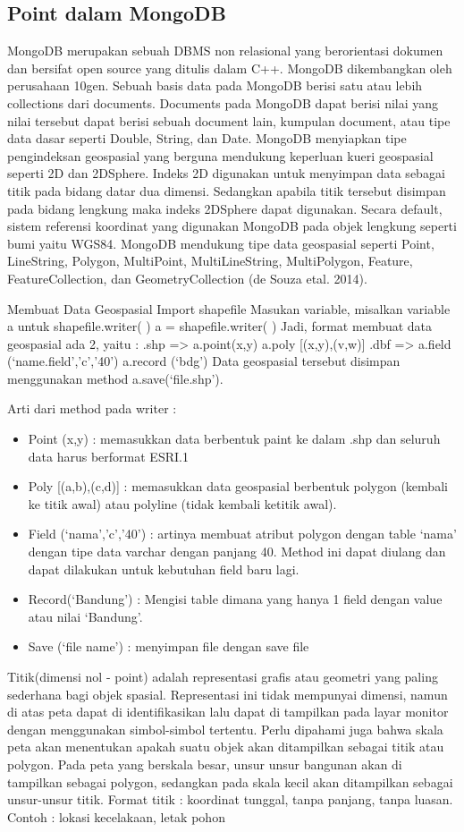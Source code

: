 \subsection{Point dalam MongoDB}
	MongoDB merupakan sebuah DBMS non relasional yang berorientasi dokumen dan bersifat open source yang ditulis dalam C++. MongoDB dikembangkan oleh perusahaan 10gen. Sebuah basis data pada MongoDB berisi satu atau lebih collections dari documents. Documents pada MongoDB dapat berisi nilai yang nilai tersebut dapat berisi sebuah document lain, kumpulan document, atau tipe data dasar seperti Double, String, dan Date. MongoDB menyiapkan tipe pengindeksan geospasial yang berguna mendukung keperluan kueri geospasial seperti 2D dan 2DSphere. Indeks 2D digunakan untuk menyimpan data sebagai titik pada bidang datar dua dimensi. Sedangkan apabila titik tersebut disimpan pada bidang lengkung maka indeks 2DSphere dapat digunakan. Secara default, sistem referensi koordinat yang digunakan MongoDB pada objek lengkung seperti bumi yaitu WGS84. MongoDB mendukung tipe data geospasial seperti Point, LineString, Polygon, MultiPoint, MultiLineString, MultiPolygon, Feature, FeatureCollection, dan GeometryCollection (de Souza etal. 2014).

Membuat Data Geospasial
Import shapefile
Masukan variable, misalkan variable a untuk shapefile.writer( )
a = shapefile.writer( )
Jadi, format membuat data geospasial ada 2, yaitu :
.shp => a.point(x,y)
a.poly [(x,y),(v,w)]
.dbf => a.field (‘name.field’,’c’,’40’)
a.record (‘bdg’)
Data geospasial tersebut disimpan menggunakan method a.save(‘file.shp’).

Arti dari method pada writer :
\begin{itemize}
\item Point (x,y)	: memasukkan data berbentuk paint ke dalam .shp dan seluruh data harus  berformat ESRI.1
\item Poly [(a,b),(c,d)]	: memasukkan data geospasial berbentuk polygon (kembali ke titik    awal) atau polyline (tidak kembali ketitik awal).
\item Field (‘nama’,’c’,’40’)	: artinya membuat atribut polygon dengan table ‘nama’ dengan tipe data varchar dengan panjang 40. Method ini dapat diulang dan dapat dilakukan untuk kebutuhan field baru lagi.
\item Record(‘Bandung’)	: Mengisi table dimana yang hanya 1 field dengan value atau nilai    ‘Bandung’.
\item Save (‘file name’)	: menyimpan file dengan save file
\end{itemize}

	Titik(dimensi nol - point) adalah representasi grafis atau geometri yang paling sederhana bagi objek spasial. Representasi ini tidak mempunyai dimensi, namun di atas peta dapat di identifikasikan lalu dapat di tampilkan pada layar monitor dengan menggunakan simbol-simbol tertentu. Perlu dipahami juga bahwa skala peta akan menentukan apakah suatu objek akan ditampilkan sebagai titik atau polygon. Pada peta yang berskala besar, unsur unsur bangunan akan di tampilkan sebagai polygon, sedangkan pada skala kecil akan ditampilkan sebagai unsur-unsur titik.
Format titik : koordinat tunggal, tanpa panjang, tanpa luasan.
Contoh : lokasi kecelakaan, letak pohon


